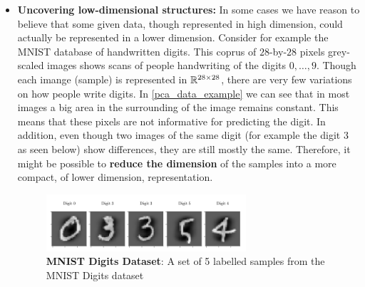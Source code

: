 \begin{itemize}
\item \textbf{Uncovering low-dimensional structures:} In some cases we have reason to believe that some given data, though represented in high dimension, could actually be represented in a lower dimension. Consider for example the MNIST database of handwritten digits. This coprus of $28$-by-$28$ pixels grey-scaled images shows scans of people handwriting of the digits $0,\ldots,9$. Though each imange (sample) is represented in $\mathbb{R}^{28\times 28}$, there are very few variations on how people write digits. In \autoref{pca_data_example} we can see that in most images a big area in the surrounding of the image remains constant. This means that these pixels are not informative for predicting the digit. In addition, even though two images of the same digit (for example the digit $3$ as seen below) show differences, they are still mostly the same. Therefore, it might be possible to \textbf{reduce the dimension} of the samples into a more compact, of lower dimension, representation.

\begin{figure}[h!]
	\centering
	\includegraphics[width=0.7\textwidth]{chapters/unsupervised.learning/figures/pca_data_Digit.png}
	\caption{\textbf{MNIST Digits Dataset}: A set of 5 labelled samples from the MNIST Digits dataset}\label{pca_data_example}
\end{figure}


\end{itemize}
